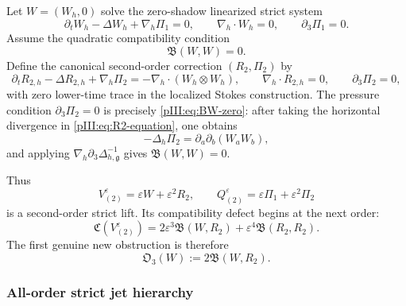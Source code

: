 \documentclass[11pt]{article}
\numberwithin{equation}{section}
\theoremstyle{plain}
\theoremstyle{definition}
\theoremstyle{remark}
\newcommand{\eps}{\varepsilon}
\newcommand{\nabh}{\nabla_h}
\newcommand{\divh}{\nabla_h\!\cdot}
\newcommand{\calB}{\mathfrak B}
\newcommand{\calC}{\mathfrak C}
\begin{document}
Let \(W=(W_h,0)\) solve the zero-shadow linearized strict system
\begin{equation}\label{pIII:eq:zero-linearized}
        \partial_tW_h-\Delta W_h+\nabh\Pi_1=0,
        \qquad
        \divh W_h=0,
        \qquad
        \partial_3\Pi_1=0.
\end{equation}
Assume the quadratic compatibility condition
\begin{equation}\label{pIII:eq:BW-zero}
        \calB(W,W)=0.
\end{equation}
Define the canonical second-order correction \((R_2,\Pi_2)\) by
\begin{equation}\label{pIII:eq:R2-equation}
        \partial_tR_{2,h}-\Delta R_{2,h}+\nabh\Pi_2
        =
        -\nabh\cdot(W_h\otimes W_h),
        \qquad
        \divh R_{2,h}=0,
        \qquad
        \partial_3\Pi_2=0,
\end{equation}
with zero lower-time trace in the localized Stokes construction.  The pressure condition
\(\partial_3\Pi_2=0\) is precisely \eqref{pIII:eq:BW-zero}: after taking the horizontal
divergence in \eqref{pIII:eq:R2-equation}, one obtains
\[
        -\Delta_h\Pi_2=\partial_a\partial_b(W_aW_b),
\]
and applying \(\nabh\partial_3\Delta_{h,\mathfrak g}^{-1}\) gives \(\calB(W,W)=0\).

Thus
\[
        V^\eps_{(2)}=\eps W+\eps^2R_2,
        \qquad
        Q^\eps_{(2)}=\eps\Pi_1+\eps^2\Pi_2
\]
is a second-order strict lift.  Its compatibility defect begins at the next order:
\begin{equation}\label{pIII:eq:third-obstruction}
        \calC(V^\eps_{(2)})
        =2\eps^3\calB(W,R_2)+\eps^4\calB(R_2,R_2).
\end{equation}
The first genuine new obstruction is therefore
\begin{equation}\label{pIII:eq:O3}
        \mathfrak O_3(W):=2\calB(W,R_2).
\end{equation}

\subsubsection{All-order strict jet hierarchy}
\end{document}
